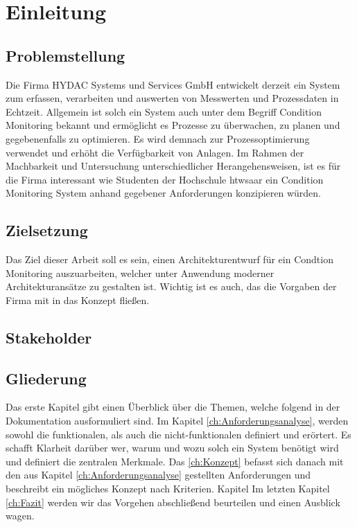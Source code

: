 \chapter{Einleitung}
\label{ch:Einleitung}


\section{Problemstellung}
Die Firma HYDAC Systems und Services GmbH entwickelt derzeit ein System zum erfassen, verarbeiten und auswerten von Messwerten und Prozessdaten in Echtzeit. Allgemein ist solch ein System auch unter dem Begriff Condition Monitoring bekannt und ermöglicht es Prozesse zu überwachen, zu planen und gegebenenfalls zu optimieren. Es wird demnach zur Prozessoptimierung verwendet und erhöht die Verfügbarkeit von Anlagen. Im Rahmen der Machbarkeit und Untersuchung unterschiedlicher Herangehensweisen, ist es für die Firma interessant wie Studenten der Hochschule htwsaar ein Condition Monitoring System anhand gegebener Anforderungen konzipieren würden.

\section{Zielsetzung}
Das Ziel dieser Arbeit soll es sein, einen Architekturentwurf für ein Condtion Monitoring auszuarbeiten, welcher unter Anwendung moderner Architekturansätze zu gestalten ist. Wichtig ist es auch, das die Vorgaben der Firma mit in das Konzept fließen.

\section{Stakeholder}

\section{Gliederung}
Das erste Kapitel gibt einen Überblick über die Themen, welche folgend in der Dokumentation ausformuliert sind. Im Kapitel \ref{ch:Anforderungsanalyse}, werden sowohl die funktionalen, als auch die nicht-funktionalen definiert und erörtert. Es schafft Klarheit darüber wer, warum und wozu solch ein System benötigt wird und definiert die zentralen Merkmale. Das \ref{ch:Konzept} befasst sich danach mit den aus Kapitel \ref{ch:Anforderungsanalyse} gestellten Anforderungen und beschreibt ein mögliches Konzept nach Kriterien. Kapitel Im letzten Kapitel \ref{ch:Fazit} werden wir das Vorgehen abschließend beurteilen und einen Ausblick wagen.